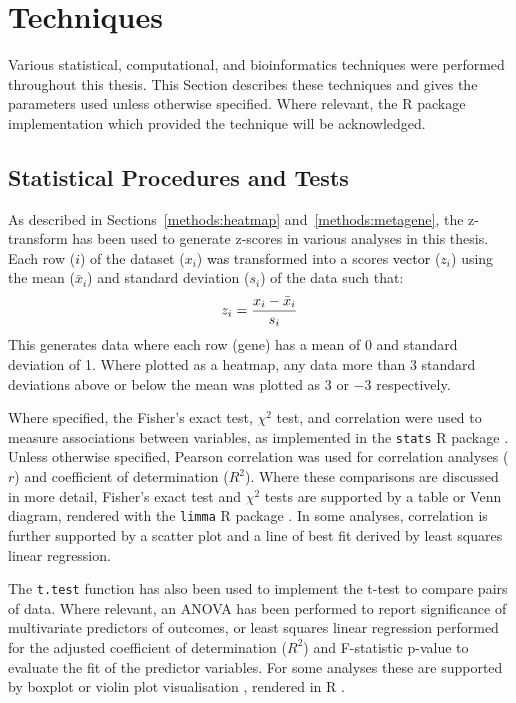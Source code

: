 \section{Techniques}
Various statistical, computational, and \gls{bioinformatics} techniques were performed throughout this thesis. This Section describes these techniques and gives the parameters used unless otherwise specified. Where relevant, the R package implementation which provided the technique will be acknowledged. 

\subsection{Statistical Procedures and Tests}

As described in Sections~\ref{methods:heatmap} and~\ref{methods:metagene}, the z-transform has been used to generate z-scores in various analyses in this thesis. Each row (\textcolor{black}{$i$}) of the dataset ($x_i$) \textcolor{black}{was} transformed into a scores \textcolor{black}{vector} ($z_i$) using the mean ($\bar{x}_i$) and standard deviation ($s_i$) of the data such that:$$ z_i = \frac{\textcolor{black}{x_{i}} - \bar{x}_i}{s_i} $$
This generates data where each row (gene) has a mean of 0 and standard deviation of 1. Where plotted as a heatmap, any data more than 3 standard deviations above or below the mean was plotted as $3$ or $-3$ respectively.

Where specified, the Fisher's exact test, $\chi^2$ test, and correlation were used to measure associations between variables, as implemented in the \texttt{stats} R package \citep{R_core}. Unless otherwise specified, Pearson correlation was used for correlation analyses ($r$) and coefficient of determination ($R^2$). Where these comparisons are discussed in more detail, Fisher's exact test and $\chi^2$ tests are supported by a table or Venn diagram, rendered with the \texttt{limma} R package \citep{limma}. In some analyses, correlation is further supported by a scatter plot and a line of best fit derived by least squares linear regression. 

The \texttt{t.test} function \citep{R_core} has also been used to implement the t-test to compare pairs of data. Where relevant, an \acrfull{ANOVA} has been performed to report significance of multivariate predictors of outcomes, or least squares linear regression performed for the adjusted coefficient of determination ($R^2$) and F-statistic p-value to evaluate the fit of the predictor variables. For some analyses these are supported by boxplot or violin plot visualisation \citep{vioplot}, rendered in R \citep{R_core}.


